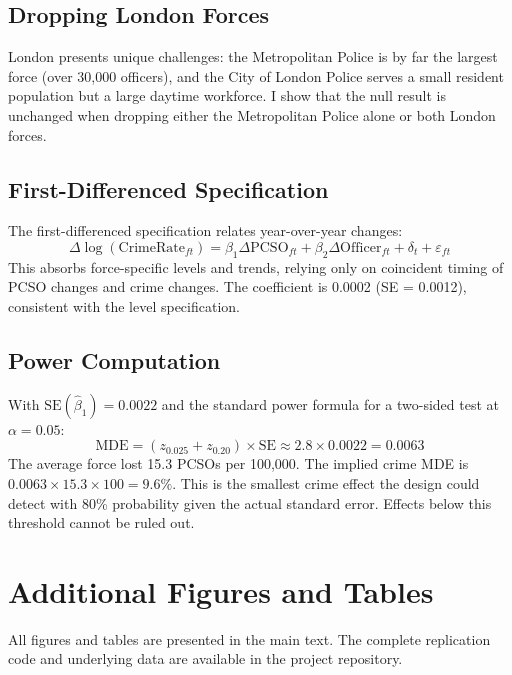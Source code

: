 \documentclass[12pt]{article}
\begin{document}
\subsection{Dropping London Forces}

London presents unique challenges: the Metropolitan Police is by far the largest force (over 30,000 officers), and the City of London Police serves a small resident population but a large daytime workforce. I show that the null result is unchanged when dropping either the Metropolitan Police alone or both London forces.

\subsection{First-Differenced Specification}

The first-differenced specification relates year-over-year changes:
\[
\Delta \log(\text{CrimeRate}_{ft}) = \beta_1 \Delta \text{PCSO}_{ft} + \beta_2 \Delta \text{Officer}_{ft} + \delta_t + \varepsilon_{ft}
\]
This absorbs force-specific levels and trends, relying only on coincident timing of PCSO changes and crime changes. The coefficient is 0.0002 (SE = 0.0012), consistent with the level specification.

\subsection{Power Computation}

With $\text{SE}(\hat{\beta}_1) = 0.0022$ and the standard power formula for a two-sided test at $\alpha = 0.05$:
\[
\text{MDE} = (z_{0.025} + z_{0.20}) \times \text{SE} \approx 2.8 \times 0.0022 = 0.0063
\]
The average force lost 15.3 PCSOs per 100,000. The implied crime MDE is $0.0063 \times 15.3 \times 100 = 9.6\%$. This is the smallest crime effect the design could detect with 80\% probability given the actual standard error. Effects below this threshold cannot be ruled out.


\section{Additional Figures and Tables}

All figures and tables are presented in the main text. The complete replication code and underlying data are available in the project repository.
\end{document}
